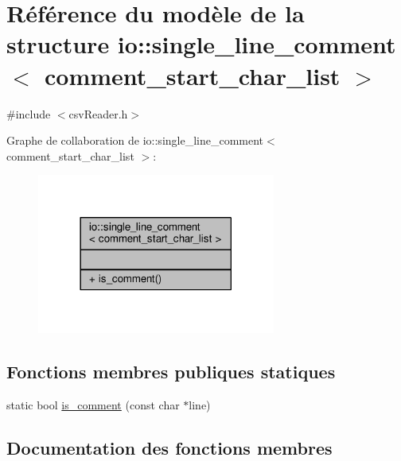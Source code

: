 \hypertarget{structio_1_1single__line__comment}{}\section{Référence du modèle de la structure io\+:\+:single\+\_\+line\+\_\+comment$<$ comment\+\_\+start\+\_\+char\+\_\+list $>$}
\label{structio_1_1single__line__comment}


{\ttfamily \#include $<$csv\+Reader.\+h$>$}



Graphe de collaboration de io\+:\+:single\+\_\+line\+\_\+comment$<$ comment\+\_\+start\+\_\+char\+\_\+list $>$\+:
\nopagebreak
\begin{figure}[H]
\begin{center}
\leavevmode
\includegraphics[width=222pt]{structio_1_1single__line__comment__coll__graph}
\end{center}
\end{figure}
\subsection*{Fonctions membres publiques statiques}
\begin{DoxyCompactItemize}
\item 
static bool \hyperlink{structio_1_1single__line__comment_ac4b029bb0efd251505f8e610cc308a92}{is\+\_\+comment} (const char $\ast$line)
\end{DoxyCompactItemize}


\subsection{Documentation des fonctions membres}
\mbox{\label{structio_1_1single__line__comment_ac4b029bb0efd251505f8e610cc308a92}} 
